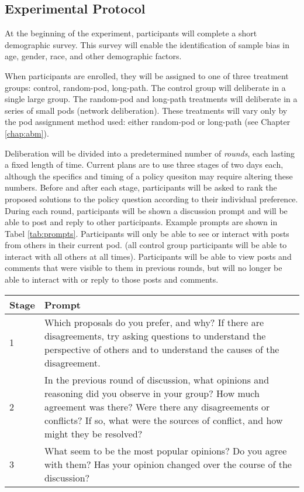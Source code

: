 \subsection{Experimental Protocol}

At the beginning of the experiment, participants will complete a short
demographic survey.
This survey will enable the identification of sample bias in age, gender, race,
and other demographic factors.

When participants are enrolled, they will be assigned to one of three treatment
groups: control, random-pod, long-path.
The control group will deliberate in a single large group.
The random-pod and long-path treatments will deliberate in a series of small
pods (network deliberation).
These treatments will vary only by the pod assignment method used:
either random-pod or long-path (see Chapter \ref{chap:abm}).

Deliberation will be divided into a predetermined number of {\em rounds}, each lasting
a fixed length of time.
Current plans are to use three stages of two days each,
although the specifics and timing of a policy quesiton may require altering these
numbers.
Before and after each stage, participants will be asked to rank the proposed
solutions to the policy question according to their individual preference.
During each round, participants will be shown a discussion prompt and will be
able to post and reply to other participants.
Example prompts are shown in Tabel \ref{tab:prompts}.
Participants will only be able to see or interact with posts from others in
their current pod.
(all control group participants will be able to interact with all others
at all times).
Participants will be able to view posts and comments that were visible to them
in previous rounds, but will no longer be able to interact with or reply to
those posts and comments.

\begin{table}
\center
\label{tab:prmpts}
\begin{tabular}{|p{0.3in}|p{3.6in}|}
\hline
Stage & Prompt \\
\hline
1 &
Which proposals do you prefer, and why?
If there are disagreements, try asking questions to understand the perspective
of others and to understand the causes of the disagreement.
\\
\hline
2 & In the previous round of discussion, what opinions and reasoning did you
observe in your group?
How much agreement was there?
Were there any disagreements or conflicts?
If so, what were the sources of conflict, and how might they be resolved?
\\
\hline
3 &
What seem to be the most popular opinions?
Do you agree with them?
Has your opinion changed over the course of the discussion?
\\
\hline
\end{tabular}
\end{table}


